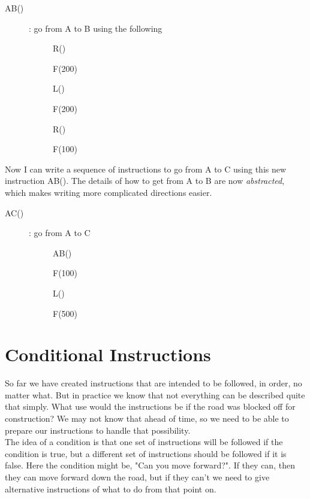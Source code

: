 \begin{description}
	\item[AB()] : go from A to B using the following
	\begin{description}
		\item[] R()
		\item[] F(200)
		\item[] L()
		\item[] F(200)
		\item[] R()
		\item[] F(100)
	\end{description}
\end{description}

Now I can write a sequence of instructions to go from A to C using this new instruction AB(). The details of how to get from A to B are now \textit{abstracted}, which makes writing more complicated directions easier.
\begin{description}
	\item[AC()] : go from A to C
	\begin{description}
		\item[] AB()
		\item[] F(100)
		\item[] L()
		\item[] F(500)
	\end{description}
\end{description}

\section{Conditional Instructions}

So far we have created instructions that are intended to be followed, in order, no matter what. But in practice we know that not everything can be described quite that simply. What use would the instructions be if the road was blocked off for construction? We may not know that ahead of time, so we need to be able to prepare our instructions to handle that possibility.\\

The idea of a condition is that one set of instructions will be followed if the condition is true, but a different set of instructions should be followed if it is false. Here the condition might be, "Can you move forward?". If they can, then they can move forward down the road, but if they can't we need to give alternative instructions of what to do from that point on.\\

